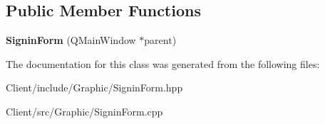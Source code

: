 \subsection*{Public Member Functions}
\begin{DoxyCompactItemize}
\item 
\mbox{\label{classbbl_1_1cli_1_1graphics_1_1_signin_form_ad24e01fe8f02d700e49e15b67794aff0}} 
{\bfseries Signin\+Form} (Q\+Main\+Window $\ast$parent)
\end{DoxyCompactItemize}


The documentation for this class was generated from the following files\+:\begin{DoxyCompactItemize}
\item 
Client/include/\+Graphic/Signin\+Form.\+hpp\item 
Client/src/\+Graphic/Signin\+Form.\+cpp\end{DoxyCompactItemize}
